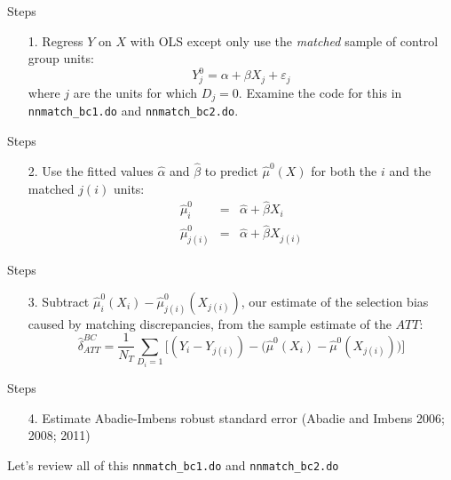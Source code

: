 \documentclass{beamer}
\begin{document}
\begin{frame}{Steps}

\begin{enumerate}
\item[1.  ]Regress $Y$ on $X$ with OLS except only use the \emph{matched} sample of control group units:
\begin{equation}
Y^0_j = \alpha + \beta X_j + \varepsilon_j \nonumber
\end{equation}where $j$ are the units for which $D_j=0$.  Examine the code for this in \texttt{nnmatch_bc1.do} and \texttt{nnmatch_bc2.do}.
\end{enumerate}

\end{frame}

\begin{frame}{Steps}

\begin{enumerate}
\item[2. ] Use the fitted values $\widehat{\alpha}$ and $\widehat{\beta}$ to predict $\widehat{\mu}^0(X)$ for both the $i$ and the matched $j(i)$ units:
\begin{eqnarray}
\widehat{\mu}^0_i &=& \widehat{\alpha} + \widehat{\beta} X_i \nonumber \\
\widehat{\mu}^0_{j(i)} &=& \widehat{\alpha} + \widehat{\beta} X_{j(i)} \nonumber
\end{eqnarray}
\end{enumerate}

\end{frame}


\begin{frame}{Steps}

\begin{enumerate}
\item[3. ] Subtract $ \widehat{\mu}_i^0(X_i) - \widehat{\mu}_{j(i)}^0(X_{j(i)})$, our estimate of the selection bias caused by matching discrepancies, from the sample estimate of the $ATT$: $$\widehat{\delta}_{ATT}^{BC} = \dfrac{1}{N_T} \sum_{D_i=1} \bigg [ (Y_i - Y_{j(i)}) - \Big(\widehat{\mu}^0(X_i) - \widehat{\mu}^0(X_{j(i)})\Big) \bigg ]$$
\end{enumerate}

\end{frame}


\begin{frame}{Steps}

\begin{enumerate}
\item[4. ] Estimate Abadie-Imbens robust standard error (Abadie and Imbens 2006; 2008; 2011)
\end{enumerate}

Let's review all of this \texttt{nnmatch_bc1.do} and \texttt{nnmatch_bc2.do}

\end{frame}
\end{document}
